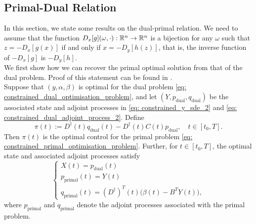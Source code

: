 \newpage
\subsection{Primal-Dual Relation}
In this section, we state some results on the dual-primal relation. We need to assume that the function $D_x[g](\omega, \cdot) : \mathbb{R}^n \to \mathbb{R}^n$ is a bijection for any $\omega$ such that $z = - D_x[g(x)]$ if and only if $x = -D_y[h(z)]$, that is, the inverse function of $-D_x[g]$ is $-D_y[h]$.\\

We first show how we can recover the primal optimal solution from that of the dual problem. Proof of this statement can be found in \cite{Duality_Method_for_Multidimensional_Nonsmooth_Constrained_Linear_Convex_Stochastic_Control}.\\

Suppose that $(y, \alpha, \beta)$ is optimal for the dual problem \eqref{eq: constrained_dual_optimisation_problem}, and let $(Y, p_{\text{dual}}, q_{\text{dual}})$ be the associated state and adjoint processes in \eqref{eq: constrained_y_sde_2} and \eqref{eq: constrained_dual_adjoint_process_2}. Define
\begin{equation}
    \pi(t) := D^\dagger(t) q_{\text{dual}}(t) - D^\dagger(t) C(t) p_{\text{dual}}, \quad t \in [t_0, T]. \label{eq: pi_from_dual_bsde}
\end{equation}
Then $\pi(t)$ is the optimal control for the primal problem \eqref{eq: constrained_primal_optimisation_problem}. Further, for $t \in [t_0, T]$, the optimal state and associated adjoint processes satisfy
\begin{equation*}
    \begin{cases}
        X(t) = p_{\text{dual}}(t)\\
        p_{\text{primal}}(t) = Y(t)\\
        q_{\text{primal}}(t) = (D^\dagger)^T(t) \big( \beta(t) - B^T Y(t) \big),
    \end{cases}
\end{equation*}
where $p_{\text{primal}}$ and $q_{\text{primal}}$ denote the adjoint processes associated with the primal problem. \\

